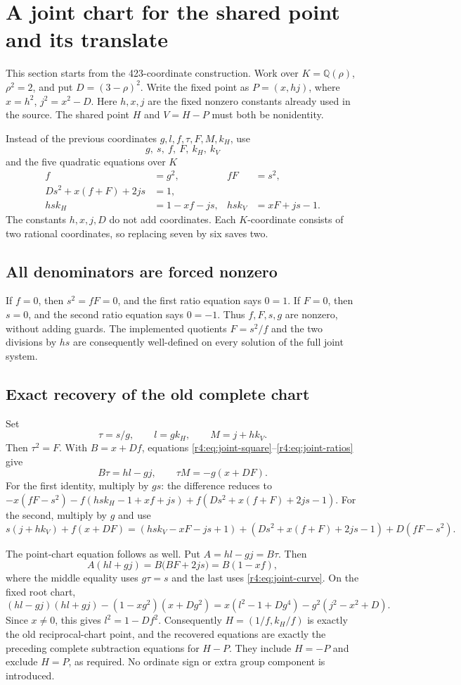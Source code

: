 \section{A joint chart for the shared point and its translate}

This section starts from the 423-coordinate construction.  Work over
$K=\mathbb Q(\rho)$, $\rho^2=2$, and put $D=(3-\rho)^2$.
Write the fixed point as $P=(x,hj)$, where $x=h^2$, $j^2=x^2-D$.
Here $h,x,j$ are the fixed nonzero constants already used in the source.
The shared point $H$ and $V=H-P$ must both be nonidentity.

Instead of the previous coordinates $g,l,f,\tau,F,M,k_H$, use
\[
 g,\ s,\ f,\ F,\ k_H,\ k_V
\]
and the five quadratic equations over $K$
\begin{align}
 f&=g^2, & fF&=s^2,\label{r4:eq:joint-square}\\
 Ds^2+x(f+F)+2js&=1,\label{r4:eq:joint-curve}\\
 hs k_H&=1-xf-js, & hs k_V&=xF+js-1.\label{r4:eq:joint-ratios}
\end{align}
The constants $h,x,j,D$ do not add coordinates.  Each $K$-coordinate
consists of two rational coordinates, so replacing seven by six saves two.

\subsection{All denominators are forced nonzero}
If $f=0$, then $s^2=fF=0$, and the first ratio equation says $0=1$.
If $F=0$, then $s=0$, and the second ratio equation says $0=-1$.
Thus $f,F,s,g$ are nonzero, without adding guards.  The implemented
quotients $F=s^2/f$ and the two divisions by $hs$ are consequently
well-defined on every solution of the full joint system.

\subsection{Exact recovery of the old complete chart}
Set
\[
 \tau=s/g,\qquad l=gk_H,\qquad M=j+hk_V.
\]
Then $\tau^2=F$.  With $B=x+Df$, equations
\eqref{r4:eq:joint-square}--\eqref{r4:eq:joint-ratios} give
\[
 B\tau=hl-gj,\qquad
 \tau M=-g(x+DF).
\]
For the first identity, multiply by $gs$: the difference reduces to
$-x(fF-s^2)-f(hsk_H-1+xf+js)+f(Ds^2+x(f+F)+2js-1)$.
For the second, multiply by $g$ and use
\[
 s(j+hk_V)+f(x+DF)
 =(hsk_V-xF-js+1)+(Ds^2+x(f+F)+2js-1)+D(fF-s^2).
\]

The point-chart equation follows as well.  Put
$A=hl-gj=B\tau$.  Then
\[
 A(hl+gj)=B\bigl(BF+2js\bigr)=B(1-xf),
\]
where the middle equality uses $g\tau=s$ and the last uses
\eqref{r4:eq:joint-curve}.  On the fixed root chart,
\[
 (hl-gj)(hl+gj)-(1-xg^2)(x+Dg^2)
 =x(l^2-1+Dg^4)-g^2(j^2-x^2+D).
\]
Since $x\ne0$, this gives $l^2=1-Df^2$.
Consequently $H=(1/f,k_H/f)$ is exactly the old reciprocal-chart point,
and the recovered equations are exactly the preceding complete
subtraction equations for $H-P$.  They include $H=-P$ and exclude
$H=P$, as required.  No ordinate sign or extra group component is introduced.

